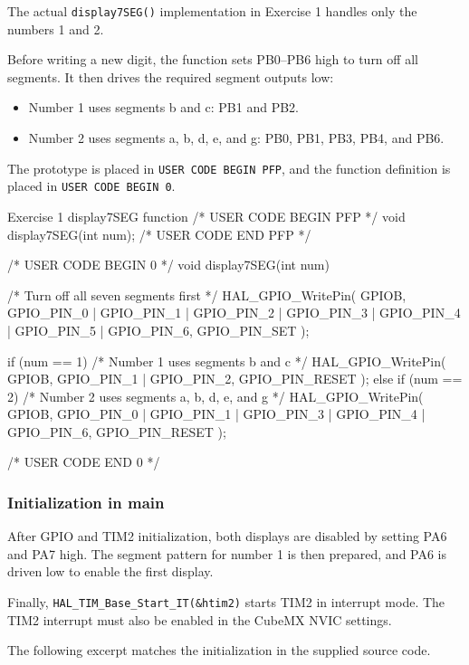 \documentclass[a4paper]{article}
\begin{document}
The actual \texttt{display7SEG()} implementation in
Exercise 1 handles only the numbers 1 and 2.

Before writing a new digit, the function sets PB0--PB6
high to turn off all segments. It then drives the
required segment outputs low:
\begin{itemize}
    \item Number 1 uses segments b and c:
          PB1 and PB2.
    \item Number 2 uses segments a, b, d, e, and g:
          PB0, PB1, PB3, PB4, and PB6.
\end{itemize}

The prototype is placed in \texttt{USER CODE BEGIN PFP},
and the function definition is placed in
\texttt{USER CODE BEGIN 0}.

\begin{stmcode}{Exercise 1 display7SEG function}
/* USER CODE BEGIN PFP */
void display7SEG(int num);
/* USER CODE END PFP */

/* USER CODE BEGIN 0 */
void display7SEG(int num){
    /* Turn off all seven segments first */
    HAL_GPIO_WritePin(
        GPIOB,
        GPIO_PIN_0 | GPIO_PIN_1 | GPIO_PIN_2 | GPIO_PIN_3 |
        GPIO_PIN_4 | GPIO_PIN_5 | GPIO_PIN_6,
        GPIO_PIN_SET
    );

    if (num == 1)
    {
        /* Number 1 uses segments b and c */
        HAL_GPIO_WritePin(
            GPIOB,
            GPIO_PIN_1 | GPIO_PIN_2,
            GPIO_PIN_RESET
        );
    }
    else if (num == 2)
    {
        /* Number 2 uses segments a, b, d, e, and g */
        HAL_GPIO_WritePin(
            GPIOB,
            GPIO_PIN_0 | GPIO_PIN_1 | GPIO_PIN_3 |
            GPIO_PIN_4 | GPIO_PIN_6,
            GPIO_PIN_RESET
        );
    }
  }
/* USER CODE END 0 */
\end{stmcode}

\subsubsection{Initialization in main}

After GPIO and TIM2 initialization, both displays are
disabled by setting PA6 and PA7 high. The segment pattern
for number 1 is then prepared, and PA6 is driven low to
enable the first display.

Finally, \texttt{HAL\_TIM\_Base\_Start\_IT(\&htim2)}
starts TIM2 in interrupt mode. The TIM2 interrupt must
also be enabled in the CubeMX NVIC settings.

The following excerpt matches the initialization
in the supplied source code.
\end{document}
